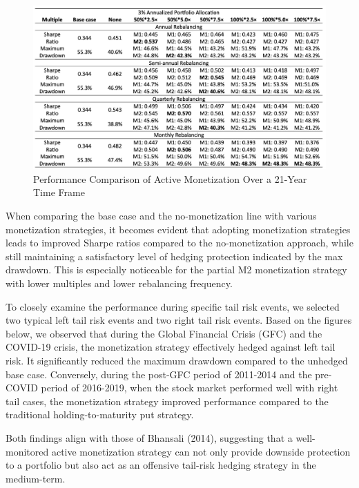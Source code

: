 \documentclass[12pt]{article}
\begin{document}
{{\begin{figure}[htp]
    \centering
    \includegraphics[width=14cm]{results.jpg}
    \caption{Performance Comparison of Active Monetization Over a 21-Year Time Frame}
    \label{fig:galaxy}
\end{figure}

When comparing the base case and the no-monetization line with various monetization strategies, it becomes evident that adopting monetization strategies leads to improved Sharpe ratios compared to the no-monetization approach, while still maintaining a satisfactory level of hedging protection indicated by the max drawdown. This is especially noticeable for the partial M2 monetization strategy with lower multiples and lower rebalancing frequency.

To closely examine the performance during specific tail risk events, we selected two typical left tail risk events and two right tail risk events. Based on the figures below, we observed that during the Global Financial Crisis (GFC) and the COVID-19 crisis, the monetization strategy effectively hedged against left tail risk. It significantly reduced the maximum drawdown compared to the unhedged base case. Conversely, during the post-GFC period of 2011-2014 and the pre-COVID period of 2016-2019, when the stock market performed well with right tail cases, the monetization strategy improved performance compared to the traditional holding-to-maturity put strategy.

Both findings align with those of Bhansali (2014), suggesting that a well-monitored active monetization strategy can not only provide downside protection to a portfolio but also act as an offensive tail-risk hedging strategy in the medium-term.

}}
\end{document}

